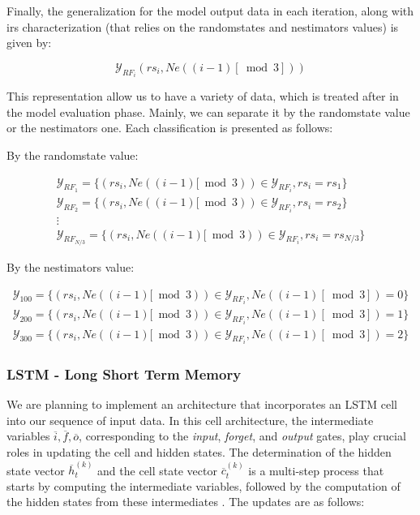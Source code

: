 \documentclass{article}
\begin{document}
Finally, the generalization for the model output data in each iteration, along with irs characterization (that relies on the random\textunderscore states and n\textunderscore estimators values) is given by:

\begin{equation*}
  \mathcal{Y}_{RF_i}(rs_i,Ne((i-1)[\bmod{3}]))
\end{equation*}

This representation allow us to have a variety of data, which is treated after in the model evaluation phase. Mainly, we can separate it by the random\textunderscore state value or the n\textunderscore estimators one. Each classification is presented as follows:

By the random\textunderscore state value:

\begin{gather*}
  \mathcal{Y}_{RF_1} = \{(rs_i,Ne((i-1)[\bmod{3})) \in \mathcal{Y}_{RF_i}, rs_i = rs_1\} \\
  \mathcal{Y}_{RF_2} = \{(rs_i,Ne((i-1)[\bmod{3})) \in \mathcal{Y}_{RF_i}, rs_i = rs_2\} \\
  \vdots \\
  \mathcal{Y}_{RF_{N/3}} = \{(rs_i,Ne((i-1)[\bmod{3})) \in \mathcal{Y}_{RF_i}, rs_i = rs_{N/3}\}  
\end{gather*}

By the n\textunderscore estimators value:

\begin{gather*}
  \mathcal{Y}_{100} = \{(rs_i,Ne((i-1)[\bmod{3})) \in \mathcal{Y}_{RF_i}, Ne((i-1)[\bmod{3}]) = 0\} \\
  \mathcal{Y}_{200} = \{(rs_i,Ne((i-1)[\bmod{3})) \in \mathcal{Y}_{RF_i}, Ne((i-1)[\bmod{3}]) = 1\} \\
  \mathcal{Y}_{300} = \{(rs_i,Ne((i-1)[\bmod{3})) \in \mathcal{Y}_{RF_i}, Ne((i-1)[\bmod{3}]) = 2\}
\end{gather*}

\subsubsection{LSTM - Long Short Term Memory}

We are planning to implement an architecture that incorporates an LSTM cell into our sequence of input data. In this cell architecture, the intermediate variables \( \overline{i}, \overline{f}, \overline{o} \), corresponding to the \textit{input}, \textit{forget}, and \textit{output} gates, play crucial roles in updating the cell and hidden states. The determination of the hidden state vector \( \overline{h}^{(k)}_{t} \) and the cell state vector \( \overline{c}^{(k)}_{t} \) is a multi-step process that starts by computing the intermediate variables, followed by the computation of the hidden states from these intermediates \cite{Aggarwal2018}. The updates are as follows:
\end{document}
